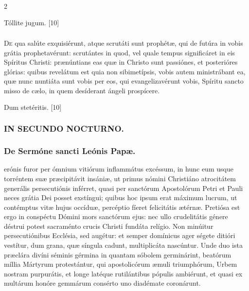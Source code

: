 \documentclass[9pt,twoside]{extarticle}
\begin{document}
\begin{multicols}{2}
\begin{tightlist}{}
\item {} Tóllite jugum. [10]
\end{tightlist}

\subsubsection*{\center {}}
\lettrine{D}e qua salúte exquisiérunt, atque scrutáti sunt prophétæ, qui de futúra in vobis grátia prophetavérunt:
scrutántes in quod, vel quale tempus significáret in eis Spíritus Christi: prænúntians eas quæ in Christo sunt passiónes, et posterióres glórias:
quibus revelátum est quia non sibimetípsis, vobis autem ministrábant ea, quæ nunc nuntiáta sunt vobis per eos, qui evangelizavérunt vobis, Spíritu sancto misso de cælo, in quem desíderant ángeli prospícere.

\begin{tightlist}{}
\item {} Dum stetéritis. [10]
\end{tightlist}

\subsubsection*{\center \textsc{IN SECUNDO NOCTURNO.}}
\subsubsection*{\center De Sermóne sancti Leónis Papæ.}
\begin{center}\end{center}
erónis furor per ómnium vitiórum inflammátus excéssum, in hunc eum usque torréntem suæ præcipitávit insániæ, ut primus nómini Christiáno atrocitátem generális persecutiónis inférret, quasi per sanctórum Apostolórum Petri et Pauli neces grátia Dei posset exstíngui; quibus hoc ipsum erat máximum lucrum, ut contémptus vitæ hujus occíduæ, percéptio fíeret felicitátis ætérnæ. Pretiósa est ergo in conspéctu Dómini mors sanctórum ejus: nec ullo crudelitátis génere déstrui potest sacraménto crucis Christi fundáta relígio. Non minúitur persecutiónibus Ecclésia, sed augétur: et semper domínicus ager ségete ditióri vestítur, dum grana, quæ síngula cadunt, multiplicáta nascúntur. Unde duo ista præclára divíni séminis gérmina in quantam sóbolem germinárint, beatórum míllia Mártyrum protestántur, qui apostolicórum æmuli triumphórum, Urbem nostram purpurátis, et longe latéque rutilántibus pópulis ambiérunt, et quasi ex multárum honóre gemmárum consérto uno diadémate coronárunt.


\end{multicols}
\end{document}
